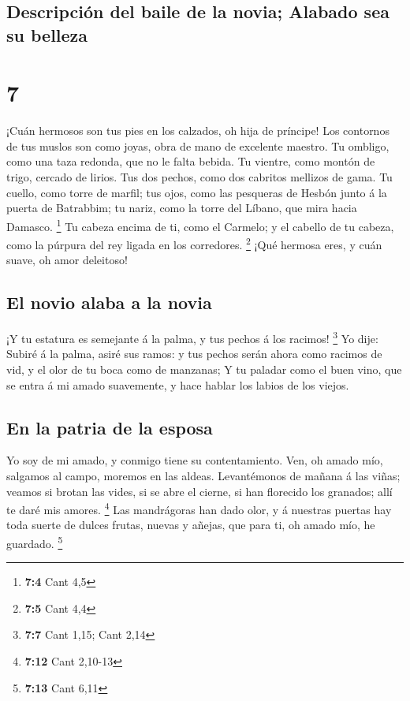\hypertarget{descripciuxf3n-del-baile-de-la-novia-alabado-sea-su-belleza}{%
\subsection{Descripción del baile de la novia; Alabado sea su
belleza}\label{descripciuxf3n-del-baile-de-la-novia-alabado-sea-su-belleza}}

\hypertarget{section-6}{%
\section{7}\label{section-6}}

 ¡Cuán hermosos son tus pies en los calzados, oh hija de
príncipe! Los contornos de tus muslos son como joyas, obra de mano de
excelente maestro.  Tu ombligo, como una taza redonda, que
no le falta bebida. Tu vientre, como montón de trigo, cercado de lirios.
 Tus dos pechos, como dos cabritos mellizos de gama.
 Tu cuello, como torre de marfil; tus ojos, como las
pesqueras de Hesbón junto á la puerta de Batrabbim; tu nariz, como la
torre del Líbano, que mira hacia Damasco. \footnote{\textbf{7:4} Cant
  4,5}  Tu cabeza encima de ti, como el Carmelo; y el
cabello de tu cabeza, como la púrpura del rey ligada en los corredores.
\footnote{\textbf{7:5} Cant 4,4}  ¡Qué hermosa eres, y
cuán suave, oh amor deleitoso!

\hypertarget{el-novio-alaba-a-la-novia}{%
\subsection{El novio alaba a la novia}\label{el-novio-alaba-a-la-novia}}

 ¡Y tu estatura es semejante á la palma, y tus pechos á
los racimos! \footnote{\textbf{7:7} Cant 1,15; Cant 2,14} 
Yo dije: Subiré á la palma, asiré sus ramos: y tus pechos serán ahora
como racimos de vid, y el olor de tu boca como de manzanas;
 Y tu paladar como el buen vino, que se entra á mi amado
suavemente, y hace hablar los labios de los viejos.

\hypertarget{en-la-patria-de-la-esposa}{%
\subsection{En la patria de la esposa}\label{en-la-patria-de-la-esposa}}

 Yo soy de mi amado, y conmigo tiene su contentamiento.
 Ven, oh amado mío, salgamos al campo, moremos en las
aldeas.  Levantémonos de mañana á las viñas; veamos si
brotan las vides, si se abre el cierne, si han florecido los granados;
allí te daré mis amores. \footnote{\textbf{7:12} Cant 2,10-13}
 Las mandrágoras han dado olor, y á nuestras puertas hay
toda suerte de dulces frutas, nuevas y añejas, que para ti, oh amado
mío, he guardado. \footnote{\textbf{7:13} Cant 6,11}

